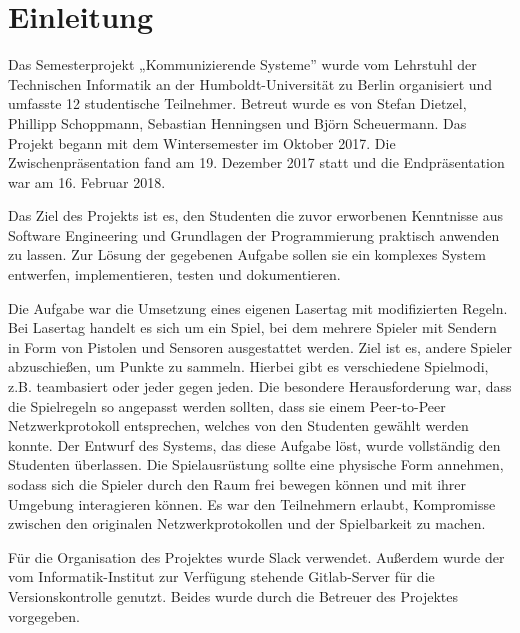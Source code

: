 \section{Einleitung}
\label{sec:einleitung}

Das Semesterprojekt „Kommunizierende Systeme” wurde vom Lehrstuhl der Technischen Informatik an der
Humboldt-Universität zu Berlin organisiert und umfasste 12 studentische Teilnehmer.
Betreut wurde es von Stefan Dietzel, Phillipp Schoppmann, Sebastian Henningsen und Björn
Scheuermann.
Das Projekt begann mit dem Wintersemester im Oktober 2017.
Die Zwischenpräsentation fand am 19. Dezember 2017 statt und die Endpräsentation war am
16. Februar 2018.

Das Ziel des Projekts ist es, den Studenten die zuvor erworbenen Kenntnisse aus
Software Engineering und Grundlagen der Programmierung praktisch anwenden zu
lassen. Zur Lösung der gegebenen Aufgabe sollen sie ein komplexes System
entwerfen, implementieren, testen und dokumentieren.

Die Aufgabe war die Umsetzung eines eigenen Lasertag mit modifizierten Regeln.
Bei Lasertag handelt es sich um ein Spiel, bei dem mehrere Spieler mit Sendern
in Form von Pistolen und Sensoren ausgestattet werden. Ziel ist es, andere
Spieler abzuschießen, um Punkte zu sammeln. Hierbei gibt es verschiedene
Spielmodi, z.B. teambasiert oder jeder gegen jeden. Die besondere Herausforderung
war, dass die Spielregeln so angepasst werden sollten, dass sie einem Peer-to-Peer
Netzwerkprotokoll entsprechen, welches von den Studenten gewählt werden konnte.
Der Entwurf des Systems, das diese Aufgabe löst, wurde vollständig den Studenten
überlassen. Die Spielausrüstung sollte eine physische Form annehmen, sodass
sich die Spieler durch den Raum frei bewegen können und mit ihrer Umgebung
interagieren können. Es war den Teilnehmern erlaubt, Kompromisse zwischen den
originalen Netzwerkprotokollen und der Spielbarkeit zu machen.

Für die Organisation des Projektes wurde Slack verwendet.
Außerdem wurde der vom Informatik-Institut zur Verfügung stehende Gitlab-Server für die
Versionskontrolle genutzt.
Beides wurde durch die Betreuer des Projektes vorgegeben.
